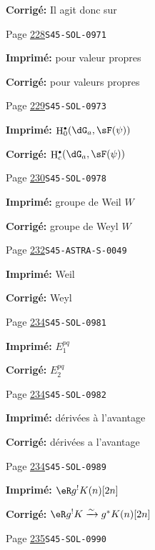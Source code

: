 \documentclass[oneside]{book}
\DeclareMathOperator{\h}{H}
\newcommand{\iso}{\xrightarrow\sim}
\theoremstyle{sga-source}
\theoremstyle{sga-source-dash}
\theoremstyle{sga-source-dotdash}
\theoremstyle{sga-source-number-note-dash}
\theoremstyle{sga-source-note-number-dotdash}
\theoremstyle{sga-source-example-dotdash}
\theoremstyle{sga-source-inline-number}
\theoremstyle{sga-source-bare-number}
\theoremstyle{sga-source}
\let\oldbullet\bullet
\renewcommand{\bullet}{\textnormal{\tiny$\oldbullet$}}
\begin{document}
\begin{description}
\par\noindent\textbf{Corrigé:} Il agit donc sur
\smallskip
\item[\hypertarget{apparatus:FR-0241}{241}] Page \hyperlink{printpage:fr:228}{228}\quad\texttt{S45-SOL-0971}
\par\noindent\textbf{Imprimé:} pour valeur propres
\par\noindent\textbf{Corrigé:} pour valeurs propres
\smallskip
\item[\hypertarget{apparatus:FR-0242}{242}] Page \hyperlink{printpage:fr:229}{229}\quad\texttt{S45-SOL-0973}
\par\noindent\textbf{Imprimé:} \(\h_0^\bullet(\dG_a,\sF(\psi))\)
\par\noindent\textbf{Corrigé:} \(\h_c^\bullet(\dG_a,\sF(\psi))\)
\smallskip
\item[\hypertarget{apparatus:FR-0243}{243}] Page \hyperlink{printpage:fr:230}{230}\quad\texttt{S45-SOL-0978}
\par\noindent\textbf{Imprimé:} groupe de Weil $W$
\par\noindent\textbf{Corrigé:} groupe de Weyl $W$
\smallskip
\item[\hypertarget{apparatus:FR-0244}{244}] Page \hyperlink{printpage:fr:232}{232}\quad\texttt{S45-ASTRA-S-0049}
\par\noindent\textbf{Imprimé:} Weil
\par\noindent\textbf{Corrigé:} Weyl
\smallskip
\item[\hypertarget{apparatus:FR-0245}{245}] Page \hyperlink{printpage:fr:234}{234}\quad\texttt{S45-SOL-0981}
\par\noindent\textbf{Imprimé:} \(E_1^{p q}\)
\par\noindent\textbf{Corrigé:} \(E_2^{p q}\)
\smallskip
\item[\hypertarget{apparatus:FR-0246}{246}] Page \hyperlink{printpage:fr:234}{234}\quad\texttt{S45-SOL-0982}
\par\noindent\textbf{Imprimé:} dérivées à l'avantage
\par\noindent\textbf{Corrigé:} dérivées a l'avantage
\smallskip
\item[\hypertarget{apparatus:FR-0247}{247}] Page \hyperlink{printpage:fr:234}{234}\quad\texttt{S45-SOL-0989}
\par\noindent\textbf{Imprimé:} \(\eR g^! K(n)[2 n]\)
\par\noindent\textbf{Corrigé:} \(\eR g^! K \iso g^\ast K(n)[2 n]\)
\smallskip
\item[\hypertarget{apparatus:FR-0248}{248}] Page \hyperlink{printpage:fr:235}{235}\quad\texttt{S45-SOL-0990}

\end{description}
\end{document}
